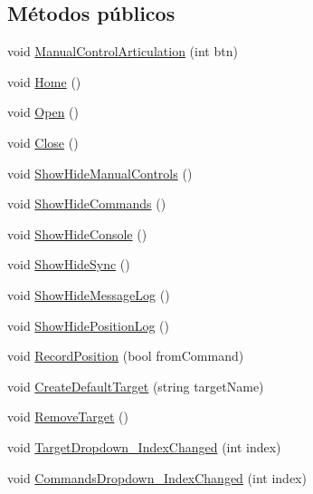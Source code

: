 \subsection*{Métodos públicos}
\begin{DoxyCompactItemize}
\item 
void \mbox{\hyperlink{class_game_controller_af2f693d76f1b9bf4ff0403802ad44cae}{Manual\+Control\+Articulation}} (int btn)
\item 
void \mbox{\hyperlink{class_game_controller_a92a798e28f38aa15306e58dbdef1099a}{Home}} ()
\item 
void \mbox{\hyperlink{class_game_controller_ab69f0ec04df1e4d52b182d1dddd0606c}{Open}} ()
\item 
void \mbox{\hyperlink{class_game_controller_a232d433ba9f07944bcc274841bf8cc7c}{Close}} ()
\item 
void \mbox{\hyperlink{class_game_controller_ab55a4d6d21f7e08aac2e27ad92033d56}{Show\+Hide\+Manual\+Controls}} ()
\item 
void \mbox{\hyperlink{class_game_controller_a473137527a8eb571f745ba44752e0a79}{Show\+Hide\+Commands}} ()
\item 
void \mbox{\hyperlink{class_game_controller_ad037a03af50093f97a244acb6ee7cfb5}{Show\+Hide\+Console}} ()
\item 
void \mbox{\hyperlink{class_game_controller_a0c878163f61d0c5f249f06076eb4414b}{Show\+Hide\+Sync}} ()
\item 
void \mbox{\hyperlink{class_game_controller_a3424f128577eb9fca02bc4eeb5c00f52}{Show\+Hide\+Message\+Log}} ()
\item 
void \mbox{\hyperlink{class_game_controller_a4115faf1339706f462166c1f82d9ec8c}{Show\+Hide\+Position\+Log}} ()
\item 
void \mbox{\hyperlink{class_game_controller_aad5d8a92a01bb1b946890c227e36ba41}{Record\+Position}} (bool from\+Command)
\item 
void \mbox{\hyperlink{class_game_controller_a0f08cc86bd15fbe811ce9e54a83e67d9}{Create\+Default\+Target}} (string target\+Name)
\item 
void \mbox{\hyperlink{class_game_controller_ad8f76a41d0163fd06971dffce1d61c97}{Remove\+Target}} ()
\item 
void \mbox{\hyperlink{class_game_controller_a6de8761e6cd2b07a857ea3ec0544fa40}{Target\+Dropdown\+\_\+\+Index\+Changed}} (int index)
\item 
void \mbox{\hyperlink{class_game_controller_a2ea8f0a42452c5dd938feed2713f87c7}{Commands\+Dropdown\+\_\+\+Index\+Changed}} (int index)

\end{DoxyCompactItemize}
